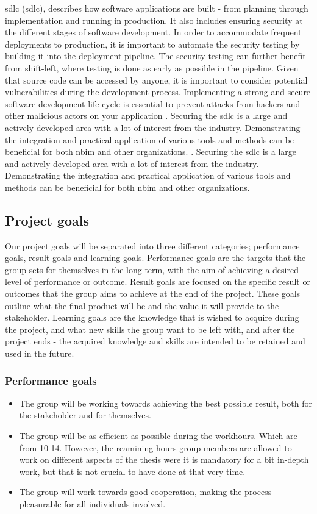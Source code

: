 \acrlong{sdlc} (\acrshort{sdlc}), describes how software applications are built - from planning through implementation and running in production. It also includes ensuring security at the different stages of software development. In order to accommodate frequent deployments to production, it is important to automate the security testing by building it into the deployment pipeline. The security testing can further benefit from shift-left, where testing is done as early as possible in the pipeline. Given that source code can be accessed by anyone, it is important to consider potential vulnerabilities during the development process. Implementing a strong and secure software development life cycle is essential to prevent attacks from hackers and other malicious actors on your application 
\cite{sdlc1}. Securing the \acrshort{sdlc} is a large and actively developed area with a lot of interest from the industry. Demonstrating the integration and practical application of various tools and methods can be beneficial for both \acrshort{nbim} and other organizations.
\cite{sdlc1}. Securing the \acrshort{sdlc} is a large and actively developed area with a lot of interest from the industry. Demonstrating the integration and practical application of various tools and methods can be beneficial for both \acrshort{nbim} and other organizations.


\subsection{Project goals}
Our project goals will be separated into three different categories; performance goals, result goals and learning goals. Performance goals are the targets that the group sets for themselves in the long-term, with the aim of achieving a desired level of performance or outcome. Result goals are focused on the specific result or outcomes that the group aims to achieve at the end of the project. These goals outline what the final product will be and the value it will provide to the stakeholder. Learning goals are the knowledge that is wished to acquire during the project, and what new skills the group want to be left with, and after the project ends - the acquired knowledge and skills are intended to be retained and used in the future. 

\subsubsection{Performance goals}
\begin{itemize}
    \item  The group will be working towards achieving the best possible result, both for the stakeholder and for themselves.
    \item The group will be as efficient as possible during the workhours. Which are from 10-14. However, the reamining hours group members are allowed to work on different aspects of the thesis were it is mandatory for a bit in-depth work, but that is not crucial to have done at that very time. 
    \item The group will work towards good cooperation, making the process pleasurable for all individuals involved.
\end{itemize}


